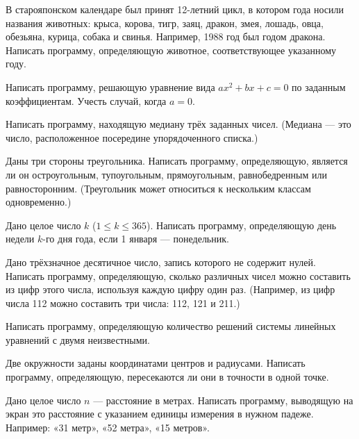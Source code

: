 \task {}В старояпонском календаре был
принят 12-летний цикл, в котором года носили названия животных: крыса,
корова, тигр, заяц, дракон, змея, лошадь, овца, обезьяна, курица,
собака и свинья. Например, 1988 год был годом дракона. Написать
программу, определяющую животное, соответствующее указанному году.

\task Написать программу, решающую уравнение вида $a x^2 + b x + c =
0$ по заданным коэффициентам. Учесть случай, когда $a = 0.$

\task Написать программу, находящую медиану трёх заданных
чисел. (Медиана — это число,
расположенное посередине упорядоченного списка.)

\task Даны три стороны треугольника. Написать программу, определяющую,
является ли он остроугольным, тупоугольным, прямоугольным,
равнобедренным или равносторонним. (Треугольник может относиться к
нескольким классам одновременно.)

\task Дано целое число $k$ ($1 \leqslant k \leqslant 365$). Написать
программу, определяющую день недели $k$-го дня года, если 1 января —
понедельник.

\task Дано трёхзначное десятичное число, запись которого не содержит
нулей. Написать программу, определяющую, сколько различных чисел можно
составить из цифр этого числа, используя каждую цифру один раз.
(Например, из цифр числа 112 можно составить три числа: 112, 121 и 211.)

\task Написать программу, определяющую количество решений системы
линейных уравнений с двумя неизвестными.

\task Две окружности заданы координатами центров и радиусами. Написать
программу, определяющую, пересекаются ли они в точности в одной точке.

\task Дано целое число $n$ — расстояние в метрах. Написать программу,
выводящую на экран это расстояние с указанием единицы измерения в
нужном падеже. Например: «31 метр», «52 метра», «15 метров».

